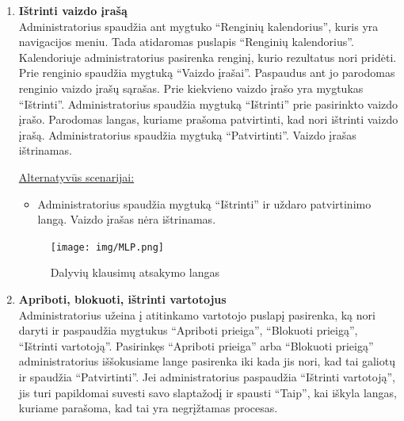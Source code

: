 \documentclass{VUMIFPSkursinis}
\begin{document}
\begin{enumerate} [label = \textbf{U\arabic*.}]
					\underline{Alternatyvūs scenarijai:}
					\begin{itemize}
						\item Metama klaida, jei bandoma įkelti failą iš kompiuterio ir įvesti nuorodą.
						\item Metama klaida, jei bando talpinti netinkamo formato failą.
					\end{itemize}
				
				\begin{figure}[H]
					\centering
					\texttt{[image: img/MLP.png]}
					\caption{Dalyvių klausimų atsakymo langas}
					\label{fig:atsakyti-klausimus}
				\end{figure}
					
			\item \textbf{Ištrinti vaizdo įrašą}   \\
					Administratorius spaudžia ant mygtuko “Renginių kalendorius”, kuris yra navigacijos meniu. Tada atidaromas puslapis “Renginių kalendorius”. Kalendoriuje administratorius pasirenka renginį, kurio rezultatus nori pridėti. Prie renginio spaudžia mygtuką “Vaizdo įrašai”. Paspaudus ant jo parodomas renginio vaizdo įrašų sąrašas. Prie kiekvieno vaizdo įrašo yra mygtukas “Ištrinti”. Administratorius spaudžia mygtuką “Ištrinti” prie pasirinkto vaizdo įrašo. Parodomas langas, kuriame prašoma patvirtinti, kad nori ištrinti vaizdo įrašą. Administratorius spaudžia mygtuką “Patvirtinti”. Vaizdo įrašas ištrinamas.
					
					\underline{Alternatyvūs scenarijai:}
					\begin{itemize}
						\item Administratorius spaudžia mygtuką “Ištrinti” ir uždaro patvirtinimo langą. Vaizdo įrašas nėra ištrinamas.
					\end{itemize}
				
				\begin{figure}[H]
					\centering
					\texttt{[image: img/MLP.png]}
					\caption{Dalyvių klausimų atsakymo langas}
					\label{fig:atsakyti-klausimus}
				\end{figure}
					
			\item \textbf{Apriboti, blokuoti, ištrinti vartotojus}   \\
					Administratorius užeina į atitinkamo vartotojo puslapį pasirenka, ką nori daryti ir paspaudžia mygtukus “Apriboti prieiga”, “Blokuoti prieigą”, “Ištrinti vartotoją”. Pasirinkęs “Apriboti prieiga” arba “Blokuoti prieigą” administratorius iššokusiame lange pasirenka iki kada jis nori, kad tai galiotų ir spaudžia “Patvirtinti”. Jei administratorius paspaudžia “Ištrinti vartotoją”, jis turi papildomai suvesti savo slaptažodį ir spausti “Taip”, kai iškyla langas, kuriame parašoma, kad tai yra negrįžtamas procesas.
					

\end{enumerate}
\end{document}
